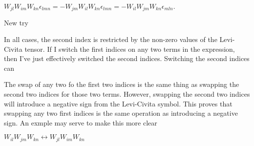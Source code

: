 \documentclass[prb,preprint]
{revtex4-1}
\begin{document}
$W_{jl}W_{im}W_{kn}\epsilon_{lmn} = -W_{jm}W_{il}W_{kn}\epsilon_{lmn} = -W_{il}W_{jm}W_{kn}\epsilon_{mln}$.

New try

In all cases, the second index is restricted by the non-zero values of the Levi-Civita tensor.  If I switch the first indices on any two terms in the expression, then I've just effectively switched the second indices.  Switching the second indices can 


The swap of any two fo the first two indices is the same thing as swapping the second two indices for those two terms.  However, swapping the second two indices will introduce a negative sign from the Levi-Civita symbol.  This proves that swapping any two first indices is the same operation as introducing a negative sign.  An exmple may serve to make this more clear

$W_{il}W_{jm}W_{kn} \leftrightarrow W_{jl}W_{im}W_{kn}$






\end{document}
